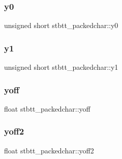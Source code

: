 \subsubsection{\texorpdfstring{y0}{y0}}
{\footnotesize\ttfamily unsigned short stbtt\+\_\+packedchar\+::y0}

\hypertarget{structstbtt__packedchar_a9569073ba79fad355210b6ffc35905a7}{}\label{structstbtt__packedchar_a9569073ba79fad355210b6ffc35905a7} 
\subsubsection{\texorpdfstring{y1}{y1}}
{\footnotesize\ttfamily unsigned short stbtt\+\_\+packedchar\+::y1}

\hypertarget{structstbtt__packedchar_a6f342ae10df5319f4999ffd256567142}{}\label{structstbtt__packedchar_a6f342ae10df5319f4999ffd256567142} 
\subsubsection{\texorpdfstring{yoff}{yoff}}
{\footnotesize\ttfamily float stbtt\+\_\+packedchar\+::yoff}

\hypertarget{structstbtt__packedchar_a2ec5bbd1010c9a9b7cbdeb7503dcaffa}{}\label{structstbtt__packedchar_a2ec5bbd1010c9a9b7cbdeb7503dcaffa} 
\subsubsection{\texorpdfstring{yoff2}{yoff2}}
{\footnotesize\ttfamily float stbtt\+\_\+packedchar\+::yoff2}

